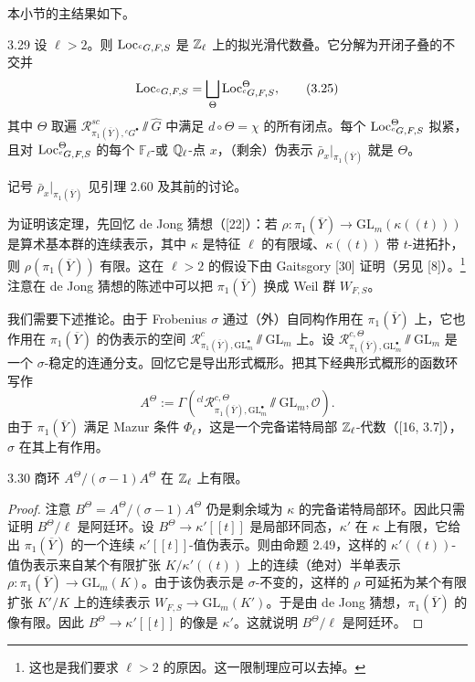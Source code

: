 本小节的主结果如下。
\begin{thm}{3.29}
设 $\ell>2$。则 $\operatorname{Loc}_{{}^{c}G,F,S}$ 是 $\mathbb{Z}_{\ell}$ 上的拟光滑代数叠。它分解为开闭子叠的不交并
\begin{equation}
\operatorname{Loc}_{{}^{c}G,F,S}=\bigsqcup_{\Theta}\operatorname{Loc}^{\Theta}_{{}^{c}G,F,S}, \tag{3.25}
\end{equation}
其中 $\Theta$ 取遍 $\mathcal R^{sc}_{\pi_1(\overline Y),{}^{c}G^{\bullet}}\sslash\hat G$ 中满足 $d\circ\Theta=\chi$ 的所有闭点。每个 $\operatorname{Loc}^{\Theta}_{{}^{c}G,F,S}$ 拟紧，且对 $\operatorname{Loc}^{\Theta}_{{}^{c}G,F,S}$ 的每个 $\mathbb F_{\ell}$-或 $\mathbb{Q}_{\ell}$-点 $x$，（剩余）伪表示 $\bar\rho_{x}|_{\pi_1(\overline Y)}$ 就是 $\Theta$。
\end{thm}

记号 $\bar\rho_{x}|_{\pi_1(\overline Y)}$ 见引理 2.60 及其前的讨论。

为证明该定理，先回忆 de Jong 猜想（[22]）：若 $\rho:\pi_1(\overline Y)\to\mathrm{GL}_m(\kappa((t)))$ 是算术基本群的连续表示，其中 $\kappa$ 是特征 $\ell$ 的有限域、$\kappa((t))$ 带 $t$-进拓扑，则 $\rho(\pi_1(\overline Y))$ 有限。这在 $\ell>2$ 的假设下由 Gaitsgory [30] 证明（另见 [8]）。\footnote{这也是我们要求 $\ell>2$ 的原因。这一限制理应可以去掉。}注意在 de Jong 猜想的陈述中可以把 $\pi_1(\overline Y)$ 换成 Weil 群 $W_{F,S}$。

我们需要下述推论。由于 Frobenius $\sigma$ 通过（外）自同构作用在 $\pi_1(\overline Y)$ 上，它也作用在 $\pi_1(\overline Y)$ 的伪表示的空间 $\mathcal R^{c}_{\pi_1(\overline Y),\mathrm{GL}^{\bullet}_m}\sslash\mathrm{GL}_m$ 上。设 $\mathcal R^{c,\Theta}_{\pi_1(\overline Y),\mathrm{GL}^{\bullet}_m}\sslash\mathrm{GL}_m$ 是一个 $\sigma$-稳定的连通分支。回忆它是导出形式概形。把其下经典形式概形的函数环写作
\[
A^{\Theta}:=\Gamma({}^{cl}\mathcal R^{c,\Theta}_{\pi_1(\overline Y),\mathrm{GL}^{\bullet}_m}\sslash\mathrm{GL}_m,\mathcal O).
\]
由于 $\pi_1(\overline Y)$ 满足 Mazur 条件 $\Phi_{\ell}$，这是一个完备诺特局部 $\mathbb{Z}_{\ell}$-代数（[16, 3.7]），$\sigma$ 在其上有作用。
\begin{lem}{3.30}
商环 $A^{\Theta}/(\sigma-1)A^{\Theta}$ 在 $\mathbb{Z}_{\ell}$ 上有限。
\end{lem}
\begin{proof}
注意 $B^{\Theta}=A^{\Theta}/(\sigma-1)A^{\Theta}$ 仍是剩余域为 $\kappa$ 的完备诺特局部环。因此只需证明 $B^{\Theta}/\ell$ 是阿廷环。设 $B^{\Theta}\to\kappa'[[t]]$ 是局部环同态，$\kappa'$ 在 $\kappa$ 上有限，它给出 $\pi_1(\overline Y)$ 的一个连续 $\kappa'[[t]]$-值伪表示。则由命题 2.49，这样的 $\kappa'((t))$-值伪表示来自某个有限扩张 $K/\kappa'((t))$ 上的连续（绝对）半单表示 $\rho:\pi_1(\overline Y)\to\mathrm{GL}_m(K)$。由于该伪表示是 $\sigma$-不变的，这样的 $\rho$ 可延拓为某个有限扩张 $K'/K$ 上的连续表示 $W_{F,S}\to\mathrm{GL}_m(K')$。于是由 de Jong 猜想，$\pi_1(\overline Y)$ 的像有限。因此 $B^{\Theta}\to\kappa'[[t]]$ 的像是 $\kappa'$。这就说明 $B^{\Theta}/\ell$ 是阿廷环。
\end{proof}

